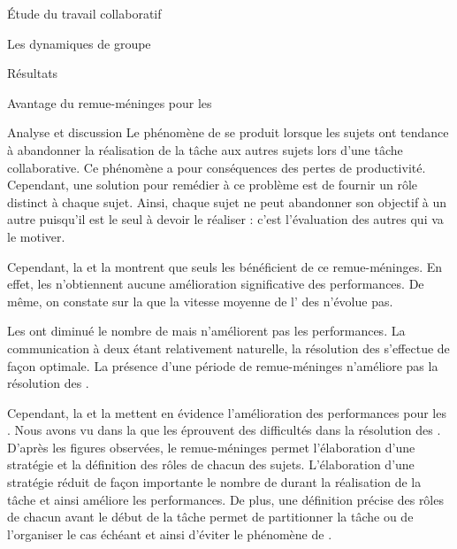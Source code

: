 \documentclass[myfrancais]{mythesis}
\begin{document}
\begin{mypart}{Étude du travail collaboratif}
\begin{mychapter}{Les dynamiques de groupe}
\begin{mysection}{Résultats}
\begin{mysubsection}{Avantage du remue-méninges pour les }
\begin{mysubsubsection}{Analyse et discussion}
						Le phénomène de  se produit lorsque les sujets ont tendance à abandonner la réalisation de la tâche aux autres sujets lors d'une tâche collaborative.
						Ce phénomène a pour conséquences des pertes de productivité.
						Cependant, une solution pour remédier à ce problème est de fournir un rôle distinct à chaque sujet.
						Ainsi, chaque sujet ne peut abandonner son objectif à un autre puisqu'il est le seul à devoir le réaliser : c'est l'évaluation des autres qui va le motiver.

						Cependant, la  et la  montrent que seuls les  bénéficient de ce remue-méninges.
						En effet, les  n'obtiennent aucune amélioration significative des performances.
						De même, on constate sur la  que la vitesse moyenne de l' des  n'évolue pas.

						Les  ont diminué le nombre de  mais n'améliorent pas les performances.
						La communication à deux étant relativement naturelle, la résolution des  s'effectue de façon optimale.
						La présence d'une période de remue-méninges n'améliore pas la résolution des .

						Cependant, la  et la  mettent en évidence l'amélioration des performances pour les .
						Nous avons vu dans la  que les  éprouvent des difficultés dans la résolution des .
						D'après les figures observées, le remue-méninges permet l'élaboration d'une stratégie et la définition des rôles de chacun des sujets.
						L'élaboration d'une stratégie réduit de façon importante le nombre de  durant la réalisation de la tâche et ainsi améliore les performances.
						De plus, une définition précise des rôles de chacun avant le début de la tâche permet de partitionner la tâche ou de l'organiser le cas échéant et ainsi d'éviter le phénomène de .


\end{mysubsubsection}
\end{mysubsection}
\end{mysection}
\end{mychapter}
\end{mypart}
\end{document}
